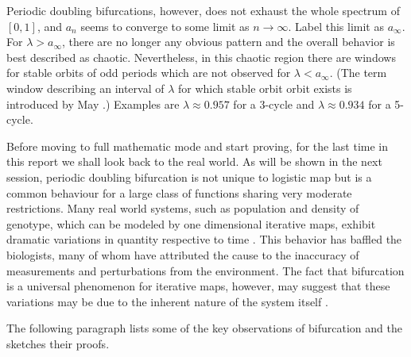 Periodic doubling bifurcations, however, does not exhaust the whole spectrum of $[0,1]$, and $a_{n}$ seems to converge to some limit as $n \rightarrow \infty$. 
Label this limit as $a_{\infty}$.
For $\lambda > a_{\infty}$, there are no longer any obvious pattern and the overall behavior is best described as chaotic. 
Nevertheless, in this chaotic region there are windows for stable orbits of odd periods which are not observed for $\lambda < a_{\infty}$. (The term window describing an interval of $\lambda$ for which stable orbit orbit exists is introduced by May \cite{May_Nature}.)
Examples are $\lambda \approx 0.957$ for a 3-cycle and $\lambda \approx 0.934$ for a 5-cycle.

Before moving to full mathematic mode and start proving, for the last time in this report we shall look back to the real world. 
As will be shown in the next session, periodic doubling bifurcation is not unique to logistic map but is a common behaviour for a large class of functions sharing very moderate restrictions. 
Many real world systems, such as population and density of genotype, which can be modeled by one dimensional iterative maps, exhibit dramatic variations in quantity respective to time \cite{colorado_potato_beetle}.
This behavior has baffled the biologists, many of whom have attributed the cause to the inaccuracy of measurements and perturbations from the environment. 
The fact that bifurcation is a universal phenomenon for iterative maps, however, may suggest that these variations may be due to the inherent nature of the system itself \cite{genotype}.


The following paragraph lists some of the key observations of bifurcation and the sketches their proofs.


